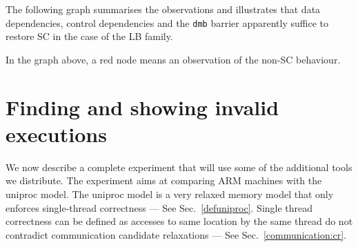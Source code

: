 \ifhevea
The following graph summarises the observations and illustrates
that data dependencies, control dependencies and the \texttt{dmb} barrier
apparently suffice to restore SC in the case of the LB family.
\begin{center}\end{center}
In the graph above, a red node means an observation of the non-SC behaviour.
\fi

\section{Finding\label{example:invalid} and showing invalid executions}
\ifhevea
We now describe a complete experiment that will use some of
the additional tools we distribute.
The experiment aims at comparing ARM machines with the uniproc model.
The uniproc model is a very relaxed memory model that only enforces
single-thread correctness --- See Sec.~\ref{defuniproc}.
Single thread correctness can be defined as accesses to same
location by the same thread do not contradict communication candidate
relaxations --- See Sec.~\ref{communication:cr}.

